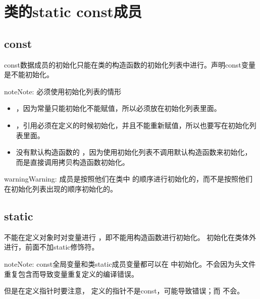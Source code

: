 \documentclass[letterpaper,10pt,english]{sphinxmanual}
\begin{document}
\section{类的static const成员}
\label{\detokenize{cpp/16_staticconst:static-const}}\label{\detokenize{cpp/16_staticconst::doc}}

\subsection{const}
\label{\detokenize{cpp/16_staticconst:const}}
const数据成员的初始化只能在类的构造函数的初始化列表中进行。声明const变量是不能初始化。

\begin{sphinxadmonition}{note}{Note:}
必须使用初始化列表的情形
\begin{itemize}
\item {} 
 ，因为常量只能初始化不能赋值，所以必须放在初始化列表里面。

\item {} 
 ，引用必须在定义的时候初始化，并且不能重新赋值，所以也要写在初始化列表里面。

\item {} 
没有默认构造函数的  ，因为使用初始化列表不调用默认构造函数来初始化，而是直接调用拷贝构造函数初始化。

\end{itemize}
\end{sphinxadmonition}

\begin{sphinxadmonition}{warning}{Warning:}
成员是按照他们在类中  的顺序进行初始化的，而不是按照他们在初始化列表出现的顺序初始化的。
\end{sphinxadmonition}


\subsection{static}
\label{\detokenize{cpp/16_staticconst:static}}
不能在定义对象时对变量进行  ，即不能用构造函数进行初始化。
初始化在类体外进行，前面不加static修饰符。

\begin{sphinxadmonition}{note}{Note:}
const全局变量和类static成员变量都可以在  中初始化。不会因为头文件重复包含而导致变量重复定义的编译错误。

但是在定义指针时要注意，  定义的指针不是const，可能导致错误；而  不会。
\end{sphinxadmonition}
\end{document}
